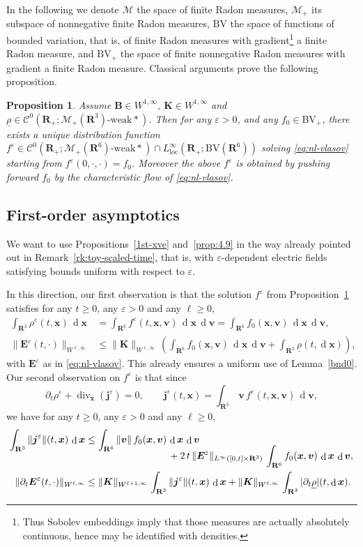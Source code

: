 \documentclass[JEP,XML,SOM,Unicode]{cedram}
\let\mathcal\mathscr
\newcommand{\BV}{\mathrm{BV}}
\let\eps\varepsilon
\let\d\partial
\DeclareMathOperator\dD{d}\let\dd\dD
\DeclareMathOperator{\Div}{div}
\theoremstyle{plain}
\newtheorem{proposition}[theorem]{Proposition}
\theoremstyle{definition}
\newcommand{\bpr}{\begin{proposition}}
\newcommand{\epr}{\end{proposition}}
\newcommand\R{\mathbf R}
\newcommand\bB{{\boldsymbol B}}
\newcommand\bE{{\boldsymbol E}}
\newcommand\bK{{\boldsymbol K}}
\newcommand\bfj{{\boldsymbol j}}
\newcommand\bfv{{\boldsymbol v}}
\newcommand\bfx{{\boldsymbol x}}
\newcommand\urho{{\underline \rho}}
\newcommand\cC{{\mathcal C}}
\newcommand\cM{{\mathcal M}}
\begin{document}
In the following we denote $\cM$ the space of finite Radon measures, $\cM_+$ its subspace of nonnegative finite Radon measures, $\BV$ the space of functions of bounded variation, that is, of finite Radon measures with gradient\footnote{Thus Sobolev embeddings imply that those measures are actually absolutely continuous, hence may be identified with densities.} a finite Radon measure, and $\BV_+$ the space of finite nonnegative Radon measures with gradient a finite Radon measure. Classical arguments prove the following proposition.

\bpr
\label{p:WP-nl}
Assume $\bB\!\in\!W^{1,\infty}$, $\bK\!\in\!W^{1,\infty}$ and $\urho\!\in\!\cC^0(\R_+;\cM_+(\R^3)\text{-weak}*)$. Then for any $\eps>0$, and any $f_0\in \BV_+$, there exists a unique distribution function $f^\eps\in\cC^0(\R_+;\cM_+(\R^6)\text{-weak}*)\cap L^\infty_\mathrm{loc}(\R_+;\BV(\R^6))$ solving \eqref{eq:nl-vlasov} starting from $f^\eps(0,\cdot,\cdot)=f_0$. Moreover the above $f^\eps$ is obtained by pushing forward $f_0$ by the characteristic flow of \eqref{eq:nl-vlasov}.
\epr

\subsection{First-order asymptotics}\label{s:1st-nl}

We want to use Propositions~\ref{1st-xve} and~\ref{prop:4.9} in the way already pointed out in Remark~\ref{rk:toy-scaled-time}, that is, with $\eps$-dependent electric fields satisfying bounds uniform with respect to $\eps$.

In this direction, our first observation is that the solution $f^\eps$ from Proposition~\ref{p:WP-nl} satisfies for any $t\geq0$, any $\eps>0$ and any $\ell\geq0$,
\begin{align*}
\int_{\R^3}\rho^\eps(t,\bfx)\,\dD \bfx
&=\int_{\R^6}f^\eps(t,\bfx,\bfv)\,\dD \bfx\,\dD \bfv
=\int_{\R^6}f_0(\bfx,\bfv)\,\dD \bfx\,\dD \bfv,\\
\|\bE^\eps(t,\cdot)\|_{W^{\ell,\infty}}
&\leq \|\bK\|_{W^{\ell,\infty}}\,(\int_{\R^6}f_0(\bfx,\bfv)\,\dD \bfx\,\dD \bfv+
\int_{\R^3}\urho(t,\dD \bfx)),
\end{align*}
with $\bE^\eps$ as in \eqref{eq:nl-vlasov}. This already ensures a uniform use of Lemma~\ref{bnd0}. Our second observation on $f^\eps$ is that since
\[
\d_t \rho^\eps+\Div_\bfx(\bfj^\eps)=0,\qquad
\bfj^\eps(t,\bfx)=\int_{\R^3}\,\bfv\,f^\eps(t,\bfx,\bfv)\,\dD \bfv,
\]
we have for any $t\geq0$, any $\eps>0$ and any $\ell\geq0$,
\begin{align*}
\int_{\R^3}\|\bfj^\eps\|(t,\bfx)\,\dD \bfx
&\leq \int_{\R^6}\|\bfv\|\,f_0(\bfx,\bfv)\,\dD \bfx\,\dD \bfv\\[-10pt]
&\hspace*{3cm}+2\,t\,\|\bE^\eps\|_{L^\infty([0,t]\times\R^3)}\,\int_{\R^6}f_0(\bfx,\bfv)\,\dD \bfx\,\dD \bfv,\\
\|\d_t\bE^\eps(t,\cdot)\|_{W^{\ell,\infty}}
&\leq
\|\bK\|_{W^{\ell+1,\infty}}\,\int_{\R^3}\|\bfj^\eps\|(t,\bfx)\,\dD \bfx+
\|\bK\|_{W^{\ell,\infty}}\,\int_{\R^3}|\d_t\urho|(t,\dD \bfx).
\end{align*}
\end{document}
